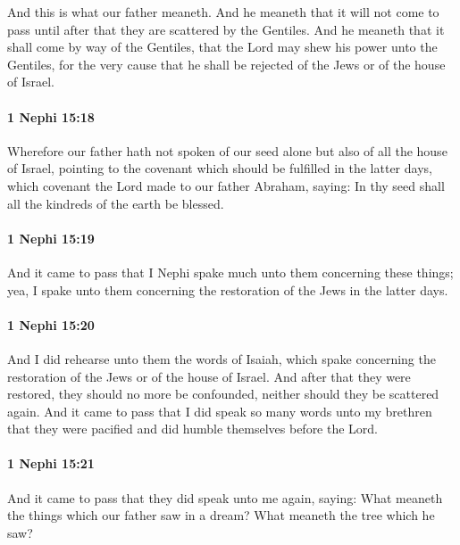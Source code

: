 			And this is what our father meaneth.
			And he meaneth that it will not come to pass
			until after that they are scattered by the Gentiles.
			And he meaneth that it shall come by way of the Gentiles,
			that the Lord may shew his power unto the Gentiles,
			for the very cause that he shall be rejected of the Jews or of the house of Israel.

		\paragraph{1 Nephi 15:18} %
			\label{1NEPHI-15-18}

			Wherefore our father hath not spoken of our seed alone
			but also of all the house of Israel,
			pointing to the covenant which should be fulfilled in the latter days,
			which covenant the Lord made to our father Abraham, saying:
			In thy seed shall all the kindreds of the earth be blessed.

		\paragraph{1 Nephi 15:19} %
			\label{1NEPHI-15-19}

			And it came to pass that I Nephi spake much unto them concerning these things;
			yea, I spake unto them concerning the restoration of the Jews in the latter days.

		\paragraph{1 Nephi 15:20} %
			\label{1NEPHI-15-20}

			And I did rehearse unto them the words of Isaiah,
			which spake concerning the restoration of the Jews or of the house of Israel.
			And after that they were restored, they should no more be confounded,
			neither should they be scattered again.
			And it came to pass that I did speak so many words unto my brethren
			that they were pacified and did humble themselves before the Lord.

		\paragraph{1 Nephi 15:21} %
			\label{1NEPHI-15-21}

			And it came to pass that they did speak unto me again, saying:
			What meaneth the things which our father saw in a dream?
			What meaneth the tree which he saw?

